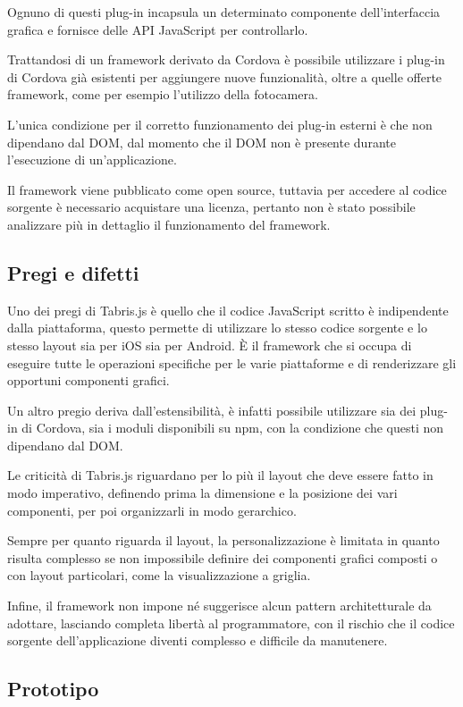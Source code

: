 Ognuno di questi plug-in incapsula un determinato componente dell'interfaccia grafica e fornisce delle API JavaScript per controllarlo.

Trattandosi di un framework derivato da Cordova è possibile utilizzare i plug-in di Cordova già esistenti per aggiungere nuove funzionalità, oltre  a quelle offerte framework, come per esempio l'utilizzo della fotocamera. 

L'unica condizione per il corretto funzionamento dei plug-in esterni è che non dipendano dal DOM, dal momento che il DOM non è presente durante l'esecuzione di un'applicazione.

Il framework viene pubblicato come open source, tuttavia per accedere al codice sorgente è necessario acquistare una licenza, pertanto non è stato possibile analizzare più in dettaglio il funzionamento del framework.

\subsection{Pregi e difetti}

Uno dei pregi di Tabris.js è quello che il codice JavaScript scritto è indipendente dalla piattaforma, questo permette di utilizzare lo stesso codice sorgente e lo stesso layout sia per iOS sia per Android.
\`E il framework che si occupa di eseguire tutte le operazioni specifiche per le varie piattaforme e di renderizzare gli opportuni componenti grafici.

Un altro pregio deriva dall'estensibilità, è infatti possibile utilizzare sia dei plug-in di Cordova, sia i moduli disponibili su \gls{npm}, con la condizione che questi non dipendano dal DOM.

Le criticità di Tabris.js riguardano per lo più il layout che deve essere fatto in modo imperativo, definendo prima la dimensione e la posizione dei vari componenti, per poi organizzarli in modo gerarchico.

Sempre per quanto riguarda il layout, la personalizzazione è limitata in quanto risulta complesso se non impossibile definire dei componenti grafici composti o con layout particolari, come la visualizzazione a griglia.

Infine, il framework non impone né suggerisce alcun pattern architetturale da adottare, lasciando completa libertà al programmatore, con il rischio che il codice sorgente dell'applicazione diventi complesso e difficile da manutenere.

\subsection{Prototipo}

